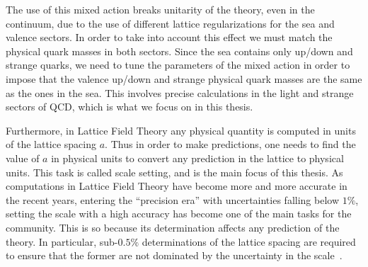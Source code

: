The use of this mixed action breaks unitarity of the theory, even in the continuum, due to the use of different lattice regularizations for the sea and valence sectors. In order to take into account this effect we must match the physical quark masses in both sectors. Since the sea contains only up/down and strange quarks, we need to tune the parameters of the mixed action in order to impose that the valence up/down and strange physical quark masses are the same as the ones in the sea. This involves precise calculations in the light and strange sectors of QCD, which is what we focus on in this thesis.

Furthermore, in Lattice Field Theory any physical quantity is computed in units of the lattice spacing $a$. Thus in order to make predictions, one needs to find the value of $a$ in physical units to convert any prediction in the lattice to physical units. This task is called scale setting, and is the main focus of this thesis. As computations in Lattice Field Theory have become more and more accurate in the recent years, entering the ``precision era'' with uncertainties falling below $1\%$, setting the scale with a high accuracy has become one of the main tasks for the community. This is so because its determination affects any prediction of the theory. In particular, sub-$0.5\%$ determinations of the lattice spacing are required to ensure that the former are not dominated by the uncertainty in the scale~\citep{Borsanyi:2020mff}.

